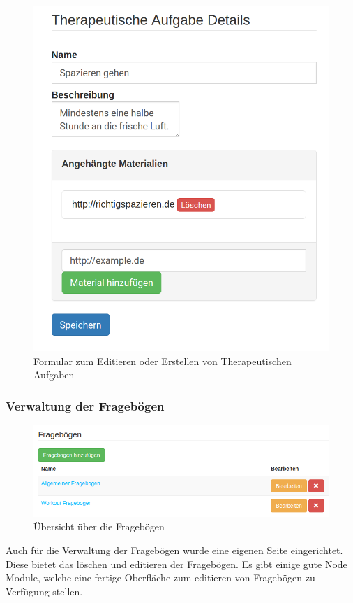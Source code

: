 \begin{figure}[H]
	\centering
	\includegraphics[scale=0.25]{images/Screenshots/TherapeutischeAufgabeDetail}
	\caption[Formular zum Editieren oder Erstellen von Therapeutischen Aufgaben]{Formular zum Editieren oder Erstellen von Therapeutischen Aufgaben}
	\label{TherapeutischeAufgabeDetail}
\end{figure}


\subsubsection{Verwaltung der Fragebögen}\label{_ImpTCFragebogen}
\begin{figure}
	\centering
	\includegraphics[scale=0.4]{images/Screenshots/FragebogenUebersicht}
	\caption[Übersicht über die Fragebögen]{Übersicht über die Fragebögen}
	\label{FragebogenUebersicht}
\end{figure}
Auch für die Verwaltung der Fragebögen wurde eine eigenen Seite eingerichtet. Diese bietet das löschen und editieren der Fragebögen. Es gibt einige gute Node Module, welche eine fertige Oberfläche zum editieren von Fragebögen zu Verfügung stellen.

